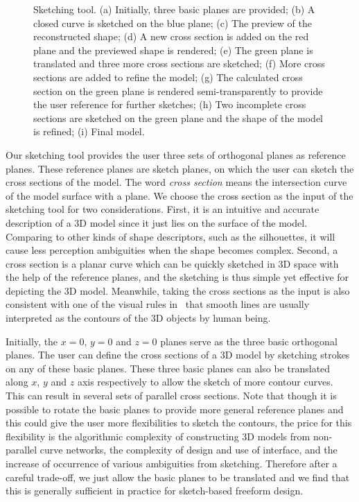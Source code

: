 \begin{figure} [htbp]
{\begin{minipage}[b]{0.26\textwidth}
    \end{minipage}}
  \caption{Sketching tool. (a) Initially, three basic planes are provided; (b) A closed curve is sketched on the blue plane; (c) The preview of the reconstructed shape; (d) A new cross section is added on the red plane and the previewed shape is rendered; (e) The green plane is translated and three more cross sections are sketched; (f) More cross sections are added to refine the model; (g) The calculated cross section on the green plane is rendered semi-transparently to provide the user reference for further sketches; (h) Two incomplete cross sections are sketched on the green plane and the shape of the model is refined; (i) Final model.}
  \label{fig:pig} %
\end{figure}

Our sketching tool provides the user three sets of orthogonal planes
as reference  planes. These reference planes are sketch planes, on
which the user can sketch the cross sections of the model. The word
\textit{cross section} means the intersection curve of the model
surface with a plane. We choose the cross section as the input of
the sketching tool for two considerations. First, it is an intuitive
and accurate description of a 3D model since it just lies on the
surface of the model. Comparing to other kinds of shape descriptors,
such as the silhouettes, it will cause less perception ambiguities
when the shape becomes complex. Second, a cross section is a planar
curve which can be quickly sketched in 3D space with the help of the
reference planes, and the sketching is thus simple yet effective for
depicting the 3D model. Meanwhile, taking the cross sections as the input 
is also consistent with one of the visual rules in~\cite{HD00} that smooth 
lines are usually interpreted as the contours of the 3D objects by human being.

Initially, the $x=0$, $y=0$ and $z=0$ planes serve as the three
basic orthogonal planes. The user can define the cross sections of a
3D model by sketching strokes on any of these basic planes. These
three basic planes can also be translated along $x$, $y$ and $z$
axis respectively to allow the sketch of more contour curves. This
can result in several sets of parallel cross sections. Note that
though it is possible to rotate the basic planes to provide more
general reference planes and this could give the user more
flexibilities to sketch the contours, the price for this flexibility
is the algorithmic complexity of constructing 3D models from
non-parallel curve networks, the complexity of design and use of
interface, and the increase of occurrence of various ambiguities
from sketching. Therefore after a careful trade-off, we just allow
the basic planes to be translated and we find that this is generally
sufficient in practice for sketch-based freeform design.

